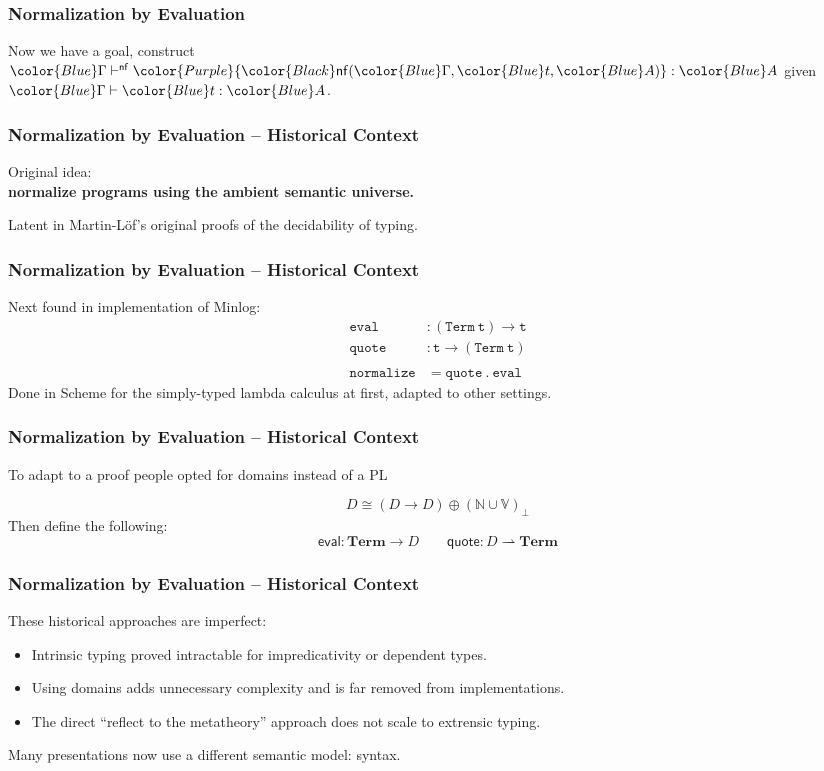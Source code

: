 \documentclass[svgnames]{beamer}
\newcommand\fmttm[1]{{\color{Blue}#1}}
\newcommand\fmtnf[1]{{\color{Purple}#1}}
\newcommand{\Term}{\mathbf{Term}}
\newcommand{\pto}{\rightharpoonup}
\newcommand{\isterm}[3]{\fmttm{#1}\vdash\fmttm{#2}:\fmttm{#3}}
\newcommand{\isnormal}[3]{\fmttm{#1}\vdash^{\mathsf{nf}}\fmtnf{#2}:\fmttm{#3}}
\newcommand{\nf}[3]{{\color{Black} \mathsf{nf}(\fmttm{#1}, \fmttm{#2}, \fmttm{#3})}}
\begin{document}
\begin{frame}
  \frametitle{Normalization by Evaluation}
  \centering
  Now we have a goal, construct $\isnormal{\Gamma}{\nf{\Gamma}{t}{A}}{A}$ given $\isterm{\Gamma}{t}{A}$.
\end{frame}
\begin{frame}
  \frametitle{Normalization by Evaluation -- Historical Context}
  \centering
  Original idea:\\ \textbf{normalize programs using the ambient semantic universe.}

  \bigskip

  Latent in Martin-L\"of's original proofs of the decidability of typing.
\end{frame}

\begin{frame}
  \frametitle{Normalization by Evaluation -- Historical Context}
  Next found in implementation of Minlog:
  \begin{align*}
    \mathtt{eval}  &: (\mathtt{Term}\ \mathtt{t}) \to \mathtt{t}\\
    \mathtt{quote} &: \mathtt{t} \to (\mathtt{Term}\ \mathtt{t})\\
    \\
    \mathtt{normalize} &= \mathtt{quote}\ .\ \mathtt{eval}
  \end{align*}
  Done in Scheme for the simply-typed lambda calculus at first, adapted to other settings.
\end{frame}

\begin{frame}[fragile]
  \frametitle{Normalization by Evaluation -- Historical Context}
  \begin{centering}
    To adapt to a proof people opted for domains instead of a PL
  \end{centering}
  \[
    D \cong (D \to D) \oplus (\mathbb{N} \cup \mathbb{V})_\bot
  \]
  Then define the following:
  \[
    \mathsf{eval} : \Term \to D \qquad \mathsf{quote} : D \pto \Term
  \]
\end{frame}

\begin{frame}
  \frametitle{Normalization by Evaluation -- Historical Context}
  These historical approaches are imperfect:
  \begin{itemize}
  \item Intrinsic typing proved intractable for impredicativity or dependent types.
  \item Using domains adds unnecessary complexity and is far removed from implementations.
  \item The direct ``reflect to the metatheory'' approach does not scale to extrensic typing.
  \end{itemize}

  \pause
  \bigskip

  Many presentations now use a different semantic model: syntax.
\end{frame}
\end{document}
